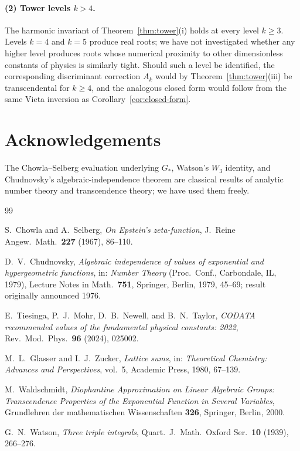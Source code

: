 \documentclass[11pt,reqno]{amsart}
\theoremstyle{plain}
\theoremstyle{definition}
\theoremstyle{remark}
\numberwithin{equation}{section}
\newcommand{\Gstar}{G_{\!*}}
\begin{document}
\paragraph{(2) Tower levels $k > 4$.}
The harmonic invariant of Theorem~\ref{thm:tower}(i) holds at every
level $k \geq 3$. Levels $k = 4$ and $k = 5$ produce real roots; we
have not investigated whether any higher level produces roots whose
numerical proximity to other dimensionless constants of physics is
similarly tight. Should such a level be identified, the corresponding
discriminant correction $A_{k}$ would by Theorem~\ref{thm:tower}(iii)
be transcendental for $k \geq 4$, and the analogous closed form would
follow from the same Vieta inversion as Corollary~\ref{cor:closed-form}.

\section*{Acknowledgements}

The Chowla--Selberg evaluation underlying $\Gstar$, Watson's $W_{3}$
identity, and Chudnovsky's algebraic-independence theorem are
classical results of analytic number theory and transcendence theory;
we have used them freely.

\begin{thebibliography}{99}

S.\ Chowla and A.\ Selberg, \textit{On Epstein's zeta-function}, J.\
Reine Angew.\ Math.\ \textbf{227} (1967), 86--110.

D.\ V.\ Chudnovsky, \textit{Algebraic independence of values of
exponential and hypergeometric functions}, in: \textit{Number Theory}
(Proc.\ Conf., Carbondale, IL, 1979), Lecture Notes in Math.\
\textbf{751}, Springer, Berlin, 1979, 45--69; result originally
announced 1976.

E.\ Tiesinga, P.\ J.\ Mohr, D.\ B.\ Newell, and B.\ N.\ Taylor,
\textit{CODATA recommended values of the fundamental physical
constants: 2022}, Rev.\ Mod.\ Phys.\ \textbf{96} (2024), 025002.

\bibitem{glasser-zucker}
M.\ L.\ Glasser and I.\ J.\ Zucker, \textit{Lattice sums}, in:
\textit{Theoretical Chemistry: Advances and Perspectives}, vol.\ 5,
Academic Press, 1980, 67--139.

M.\ Waldschmidt, \textit{Diophantine Approximation on Linear
Algebraic Groups: Transcendence Properties of the Exponential
Function in Several Variables}, Grundlehren der mathematischen
Wissenschaften \textbf{326}, Springer, Berlin, 2000.

G.\ N.\ Watson, \textit{Three triple integrals}, Quart.\ J.\ Math.\
Oxford Ser.\ \textbf{10} (1939), 266--276.

\end{thebibliography}
\end{document}
